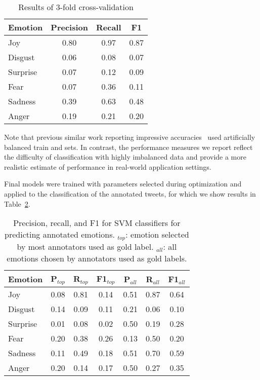 \documentclass[10pt, a4paper]{article}
\begin{document}
\begin{table}[!ht]
\centering
\begin{tabular}{l | c | c | c}
\textbf{Emotion} & \textbf{Precision} & \textbf{Recall} &   \textbf{F1} \\
\hline
             Joy & 0.80       & 0.97   & 0.87 \\
         Disgust & 0.06       & 0.08   & 0.07 \\
        Surprise & 0.07       & 0.12   & 0.09 \\
            Fear & 0.07       & 0.36   & 0.11 \\
         Sadness & 0.39       & 0.63   & 0.48 \\
           Anger & 0.19       & 0.21   & 0.20 \\
\end{tabular}
\caption{Results of 3-fold cross-validation} %
\label{tab:SVM-CV-results}
\end{table}

Note that previous similar work reporting impressive accuracies~\cite{Purver2012Experimenting} used artificially balanced train and sets. In contrast, the performance measures we report reflect the difficulty of classification with highly imbalanced data and provide a more realistic estimate of performance in real-world application settings.

Final models were trained with parameters selected during optimization and applied to the classification of the annotated tweets, for which we show results in Table~\ref{tab:svm-annot-predict}.

\begin{table}[!ht]
\centering
\begin{tabular}{l | c | c | c | c | c | c}
\textbf{Emotion} & \textbf{P$_{top}$}  & \textbf{R$_{top}$} & \textbf{F1$_{top}$} & \textbf{P$_{all}$}  & \textbf{R$_{all}$} & \textbf{F1$_{all}$} \\
\hline
         Joy &   0.08  & 0.81  & 0.14  &  0.51  & 0.87  & 0.64 \\
     Disgust &   0.14  & 0.09  & 0.11  &  0.21  & 0.06  & 0.10 \\
    Surprise &   0.01  & 0.08  & 0.02  &  0.50  & 0.19  & 0.28 \\
        Fear &   0.20  & 0.38  & 0.26  &  0.13  & 0.50  & 0.20 \\
     Sadness &   0.11  & 0.49  & 0.18  &  0.51  & 0.70  & 0.59 \\
       Anger &   0.20  & 0.14  & 0.17  &  0.50  & 0.27  & 0.35 \\

\end{tabular}
\caption{Precision, recall, and F1 for SVM classifiers for predicting annotated emotions. $_{top}$: emotion selected by most annotators used as gold label. $_{all}$: all emotions chosen by annotators used as gold labels.}
\label{tab:svm-annot-predict}
\end{table}
\end{document}
